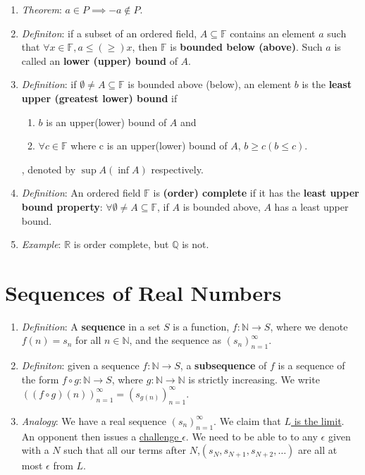 \message{ !name(cheatsheet.tex)}\documentclass{article}
\newcommand{\seqn}[1]{(#1)^\infty_{n=1}}
\begin{document}
\begin{multicols*}{3}
\begin{enumerate}
		\item \emph{Theorem}: $a\in P\implies-a\notin P$.
		\item \emph{Definiton}: if a subset of an ordered field, $A\subseteq\mathbb{F}$
		      contains an element
		      $a$ such that $\forall x\in \mathbb{F}, a\leq(\geq) x$, then
		      $\mathbb{F}$ is \textbf{bounded below (above)}. Such $a$ is called
		      an \textbf{lower (upper) bound} of $A$.

		\item \emph{Definition}: if $\emptyset\neq A\subseteq \mathbb{F}$ is
		      bounded above (below), an element $b$ is the \textbf{least upper
			      (greatest lower) bound} if
		      \begin{enumerate}
			      \item $b$ is an upper(lower) bound of $A$ and
			      \item $\forall c\in \mathbb{F}$ where c is an upper(lower) bound of
			            $A$, $b\geq c(b\leq c)$.
		      \end{enumerate}
		      , denoted by $\sup A(\inf A)$ respectively.
		\item \emph{Definition}: An ordered field $\mathbb{F}$ is \textbf{(order)
			      complete} if it has the \textbf{least upper bound property}:
		      $\forall \emptyset\neq A\subseteq\mathbb{F}$, if $A$ is bounded
		      above, $A$ has a least upper bound.
		\item \emph{Example}: $\mathbb{R}$ is order complete, but $\mathbb{Q}$
		      is not.
	\end{enumerate}

	\section{Sequences of Real Numbers}
	\begin{enumerate}
		\item \emph{Definition}: A \textbf{sequence} in a set $S$ is a function,
		      $f:\mathbb{N}\rightarrow S$, where we denote $f(n)=s_n$ for all $n\in
			      \mathbb{N}$, and the sequence as $\seqn{s_n}$.

		\item \emph{Definiton}: given a sequence $f:\mathbb{N}\rightarrow S$, a
		      \textbf{subsequence} of $f$ is a sequence of the form $f\circ
			      g:\mathbb{N}\rightarrow S$, where $g:\mathbb{N}\rightarrow\mathbb{N}$
		      is strictly increasing. We write $\seqn{(f\circ g)(n)}=\seqn{s_{g(n)}}$.
		\item \emph{Analogy}: We have a real sequence $\seqn{s_n}$. We claim
		      that \underline{$L$ is the limit}. An opponent then issues a
		      \underline{challenge $\epsilon$}. We need to be able to to any
		      $\epsilon$ given with a $N$ such that all our terms after $N$,$(s_N,
			      s_{N+1},s_{N+2},\dots)$ are all at most $\epsilon$ from $L$.


\end{enumerate}
\end{multicols*}
\end{document}
